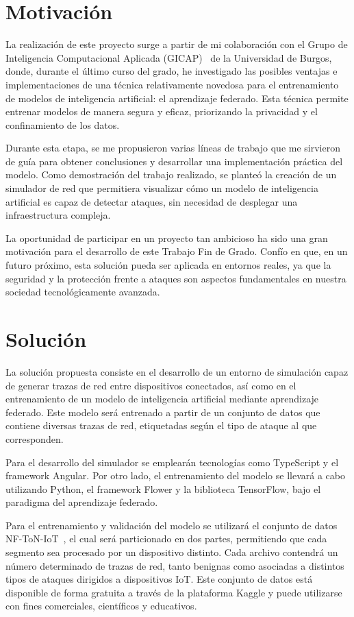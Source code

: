 \section{Motivación}
\label{sec:Motivacion}
La realización de este proyecto surge a partir de mi colaboración con el Grupo de Inteligencia Computacional Aplicada (GICAP)~\cite{gicap} de la Universidad de Burgos, donde, durante el último curso del grado, he investigado las posibles ventajas e implementaciones de una técnica relativamente novedosa para el entrenamiento de modelos de inteligencia artificial: el aprendizaje federado. Esta técnica permite entrenar modelos de manera segura y eficaz, priorizando la privacidad y el confinamiento de los datos.

Durante esta etapa, se me propusieron varias líneas de trabajo que me sirvieron de guía para obtener conclusiones y desarrollar una implementación práctica del modelo. Como demostración del trabajo realizado, se planteó la creación de un simulador de red que permitiera visualizar cómo un modelo de inteligencia artificial es capaz de detectar ataques, sin necesidad de desplegar una infraestructura compleja.

La oportunidad de participar en un proyecto tan ambicioso ha sido una gran motivación para el desarrollo de este Trabajo Fin de Grado. Confío en que, en un futuro próximo, esta solución pueda ser aplicada en entornos reales, ya que la seguridad y la protección frente a ataques son aspectos fundamentales en nuestra sociedad tecnológicamente avanzada.

\section{Solución}
\label{sec:Solucion}
La solución propuesta consiste en el desarrollo de un entorno de simulación capaz de generar trazas de red entre dispositivos conectados, así como en el entrenamiento de un modelo de inteligencia artificial mediante aprendizaje federado. Este modelo será entrenado a partir de un conjunto de datos que contiene diversas trazas de red, etiquetadas según el tipo de ataque al que corresponden.

Para el desarrollo del simulador se emplearán tecnologías como TypeScript y el framework Angular. Por otro lado, el entrenamiento del modelo se llevará a cabo utilizando Python, el framework Flower y la biblioteca TensorFlow, bajo el paradigma del aprendizaje federado.

Para el entrenamiento y validación del modelo se utilizará el conjunto de datos NF-ToN-IoT~\cite{dataset}, el cual será particionado en dos partes, permitiendo que cada segmento sea procesado por un dispositivo distinto. Cada archivo contendrá un número determinado de trazas de red, tanto benignas como asociadas a distintos tipos de ataques dirigidos a dispositivos IoT. Este conjunto de datos está disponible de forma gratuita a través de la plataforma Kaggle y puede utilizarse con fines comerciales, científicos y educativos.

